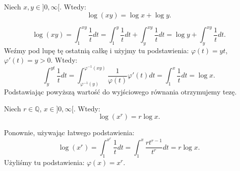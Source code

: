 \documentclass{article}
\numberwithin{defi}{section}
\numberwithin{defi}{section}
\newcommand{\Q}{\mathbb{Q}}
\newcommand{\oo}{\infty}
\begin{document}
\begin{twier}{}
    Niech $x, y \in ]0, \oo[$. Wtedy: \begin{equation*}
        \log(xy) = \log x + \log y.
    \end{equation*}
\end{twier}

\begin{dow}{}
    \begin{equation*}
        \log (xy) = \int_{1}^{xy} \frac{1}{t} dt = \int_{1}^{y} \frac{1}{t} dt + \int_{y}^{xy} \frac{1}{t} dt = \log y + \int_{y}^{xy} \frac{1}{t} dt.
    \end{equation*} Weźmy pod lupę tę ostatnią całkę i użyjmy tu podstawienia: $\varphi(t) = yt$, $\varphi'(t) = y > 0$. Wtedy: \begin{equation*}
        \int_{y}^{yt} \frac{1}{t} dt = \int_{\varphi^{-1}(y)}^{\varphi^{-1}(xy)} \frac{1}{\varphi(t)} \varphi'(t) dt = \int_{1}^{x} \frac{1}{t} dt = \log x.
    \end{equation*} Podstawiając powyższą wartość do wyjściowego równania otrzymujemy tezę.
\end{dow}

\begin{twier}[label=twier:log-potega]{}
    Niech $r \in \Q$, $x \in ]0, \oo[$. Wtedy: \begin{equation*}
        \log (x ^ r) = r \log x.
    \end{equation*}
\end{twier}

\begin{dow}{}
    Ponownie, używając łatwego podstawienia: \begin{equation*}
        \log(x^r) = \int_{1}^{x^r} \frac{1}{t} dt = \int_{1}^{x} \frac{r t^{r-1}}{t^r} dt = r \log x.
    \end{equation*} Użyliśmy tu podstawienia: $\varphi (x) = x ^r$.
\end{dow}
\end{document}
